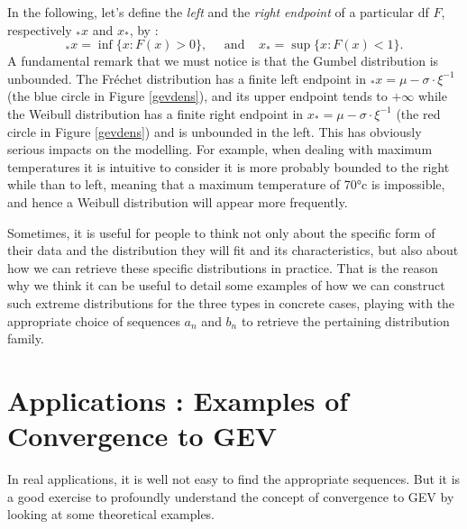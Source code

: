 In the following, let's define the \emph{left} and the \emph{right} \emph{endpoint} of a particular df $F$, respectively $_*x$ and $x_*$, by :
\begin{equation}\label{eq:endpoints}
_*x=\inf\{x:F(x)>0\}, \ \ \ \ \ \ \text{and} \ \ \ \ \  x_*=\sup\{x:F(x)<1\}.
\end{equation}
A fundamental remark that we must notice is that the Gumbel distribution is unbounded. The Fréchet distribution has a finite left endpoint in $_*x=\mu-\sigma\cdot\xi^{-1}$ (the blue circle in Figure \ref{gevdens}), and its upper endpoint tends to $+\infty$ while the Weibull distribution has a finite right endpoint in $x_*=\mu-\sigma\cdot\xi^{-1}$ (the red circle in Figure \ref{gevdens}) and is unbounded in the left. This has obviously serious impacts on the modelling. For example, when dealing with maximum temperatures it is intuitive to consider it is more probably bounded to the right while than to left, meaning that a maximum temperature of 70°c is impossible, and hence a Weibull distribution will appear more frequently. 


\vspace{.3cm}
Sometimes, it is useful for people to think not only about the
specific form of their data and the distribution they will fit and its characteristics, but also about how we can retrieve these specific distributions in practice. That is the 
reason why we think it can be useful to detail some examples of how we can construct such extreme distributions for the three types in concrete cases, playing with the appropriate choice of 
sequences $a_n$ and $b_n$ to retrieve the pertaining distribution family.



\section{Applications : Examples of Convergence to GEV}\label{sec::appconcrete}

In real applications, it is well not easy to find the appropriate sequences. But it is a good exercise to profoundly understand the concept of convergence to GEV by looking at some theoretical examples.


